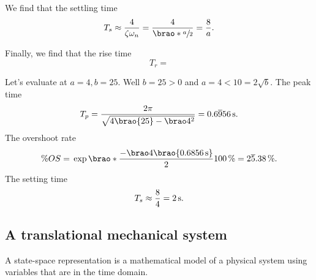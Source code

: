 \documentclass[12pt]{article}
\newcommand*\siexpr[2][]{\SI[parse-numbers=false,#1]{#2}}%
\DeclarePairedDelimiter\brao()%
\begin{document}
\begin{enumerate}
        We find that the settling time
        \begin{equation}
            T_s \approx \frac4{\zeta\omega_n} = \frac4{\brao*{\sfrac{a}2}} = \frac8a.
        \end{equation}

        Finally, we find that the rise time
        \begin{equation}
            T_r = 
        \end{equation}

        Let's evaluate at $a = 4, b = 25$. Well $b = 25 > 0$ and $a = 4 < 10 = 2\sqrt{b}$.
        The peak time
        \begin{equation}
            T_p = \frac{2\pi}{\sqrt{4\brao{25} - \brao4^2}} = \siexpr{0.6\overline956}\second.
        \end{equation}
        The overshoot rate
        \begin{equation}
                \% OS
                ={} \exp\brao*{\frac{-\brao4\brao{\SI{0.6856}\second}}2} \SI{100}\percent = \siexpr{2\overline5.38}\percent.
        \end{equation}
        The setting time
        \begin{equation}
            T_s \approx \frac84 = \SI2\second.
        \end{equation}

\end{enumerate}

\subsection{A translational mechanical system}

A state-space representation is a mathematical model of a physical system using variables that are in the time domain.
\end{document}

